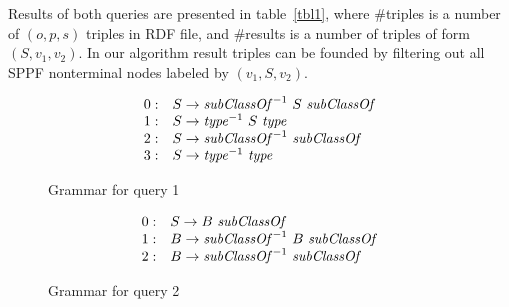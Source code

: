 Results of both queries are presented in table~\ref{tbl1}, where \#triples is a number of $(o,p,s)$ triples in RDF file, and \#results is a number of triples of form $(S,v_1,v_2)$.
In our algorithm result triples can be founded by filtering out all SPPF nonterminal nodes labeled by $(v_1,S,v_2)$.

\begin{figure}[ht]
   \begin{center}
   \[
\begin{array}{rl}
   0: & S \rightarrow \text{\textit{subClassOf}}^{-1} \ S \ \text{\textit{subClassOf}} \\ 
   1: & S \rightarrow \text{\textit{type}}^{-1} \ S \ \text{\textit{type}} \\ 
   2: & S \rightarrow \text{\textit{subClassOf}}^{-1} \ \text{\textit{subClassOf}} \\ 
   3: & S \rightarrow \text{\textit{type}}^{-1} \ \text{\textit{type}} \\ 
\end{array}
\]
   \caption{Grammar for query 1}
   \label{grammarQ1}        
   \end{center}
\end{figure}

\begin{figure}[ht]
   \begin{center}
   \[
\begin{array}{rl}
   0: & S \rightarrow B \ \text{\textit{subClassOf}} \\ 
   1: & B \rightarrow \text{\textit{subClassOf}}^{-1} \ B \ \text{\textit{subClassOf}} \\
   2: & B \rightarrow \text{\textit{subClassOf}}^{-1} \ \text{\textit{subClassOf}} \\ 
\end{array}
\]
   \caption{Grammar for query 2}
   \label{grammarQ2}        
   \end{center}
\end{figure}


